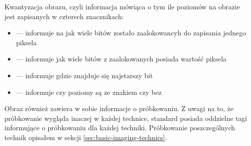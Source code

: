 \dicomRetired

\par
Kwantyzacja obrazu, czyli informacja mówiąca o tym ile poziomów na obrazie jest zapisanych w czterech znacznikach:
\begin{itemize}
    \item {} --- informuje na jak wiele bitów zostało zaalokowancyh do zapisania jednego piksela
    \item {} --- informuje jak wiele bitów z zaalokowanych posiada wartość piksela
    \item {} --- informuje gdzie znajduje się najstarszy bit
    \item {} --- informuje czy poziomy są ze znakiem czy bez
\end{itemize}

\par
Obraz \DICOM również zawiera w sobie informacje o próbkowaniu.
Z uwagi na to, że próbkowanie wygląda inaczej w każdej technice, standard posiada oddzielne tagi informujące o próbkowaniu dla każdej techniki.
Próbkowanie poszczególnych technik opisałem w sekcji \ref{sec:basic-imaging-technics}.







